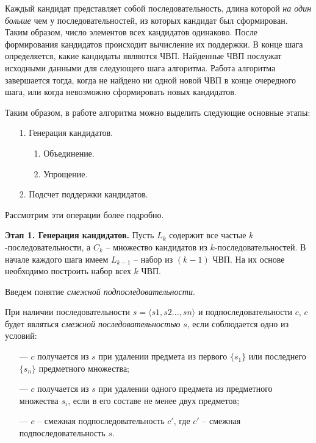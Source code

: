 Каждый кандидат представляет собой последовательность, длина которой \textit{на один больше} чем у последовательностей, из которых кандидат был сформирован. Таким образом, число элементов всех кандидатов одинаково. После формирования кандидатов происходит вычисление их поддержки. В конце шага определяется, какие кандидаты являются ЧВП. Найденные ЧВП послужат исходными данными для следующего шага алгоритма. Работа алгоритма завершается тогда, когда не найдено ни одной новой ЧВП в конце очередного шага, или когда невозможно сформировать новых кандидатов.

Таким образом, в работе алгоритма можно выделить следующие основные этапы:


\begin{enumerate}
	\item[1.] Генерация кандидатов.
	\begin{enumerate}
		\item[1.] Объединение.
		\item[2.] Упрощение.
	\end{enumerate}
	\item[2.] Подсчет поддержки кандидатов.
\end{enumerate}

Рассмотрим эти операции более подробно.

\textbf{Этап 1. Генерация кандидатов.} Пусть $L_k$ содержит все частые $k$-последовательности, а $C_k$ – множество кандидатов из $k$-последовательностей. В начале каждого шага имеем $L_{k-1}$ – набор из $(k-1)$ ЧВП. На их основе необходимо построить набор всех $k$ ЧВП.

Введем понятие \textit{смежной подпоследовательности}.

При наличии последовательности $s = \langle s1, s2..., sn \rangle$ и подпоследовательности $c$, $c$ будет являться \textit{смежной последовательностью} $s$, если соблюдается одно из условий:
\begin{itemize}
	\item[---] $c$ получается из $s$ при удалении предмета из первого $\{s_1\}$ или последнего $\{s_n\}$ предметного множества;
	\item[---] $c$ получается из $s$ при удалении одного предмета из предметного множества $s_i$, если в его составе не менее двух предметов;
	\item[---] $c$ – смежная подпоследовательность $c'$, где $c'$ – смежная подпоследовательность $s$.
\end{itemize}

